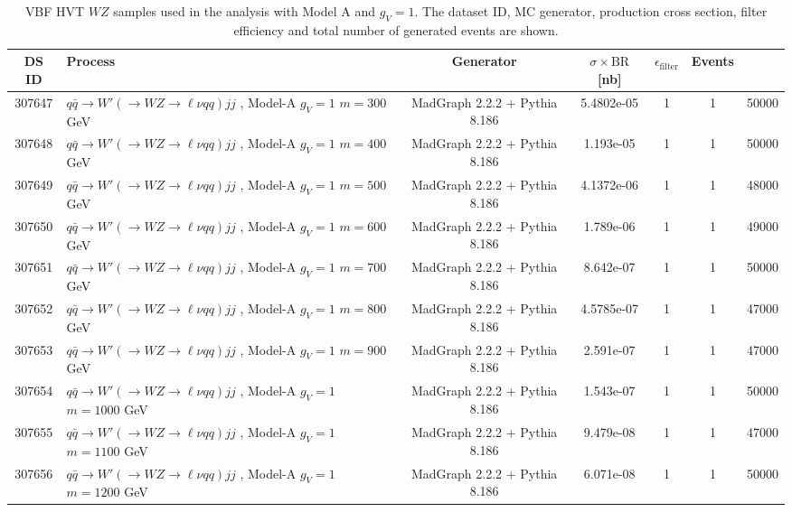 \begin{landscape}
	\begin{table}[!htb]
		\caption{VBF HVT $WZ$ samples used in the analysis with Model A and $g_V=1$. The dataset ID, MC generator, production cross section, filter efficiency and total number of generated events are shown.}
		\label{tabular:mc_samples_WprimeVBF}
		\begin{footnotesize}
			\begin{center}
				\begin{tabular}{|c|l|c|c|c|c|r|}
					\hline
					DS ID & Process & Generator & $\sigma\times\text{BR}$ [nb] & $\epsilon_{\text{filter}}$ & Events \\ \hline
					307647 & $q\bar{q} \to W'\left(\to WZ \to \ell\nu qq\right) jj$ , Model-A $g_V=1$ $m=300$  GeV& MadGraph 2.2.2 + Pythia 8.186 & 5.4802e-05 & 1 & 1 & 50000 \\
					307648 & $q\bar{q} \to W'\left(\to WZ \to \ell\nu qq\right) jj$ , Model-A $g_V=1$ $m=400$  GeV& MadGraph 2.2.2 + Pythia 8.186 & 1.193e-05 & 1 & 1 & 50000 \\
					307649 & $q\bar{q} \to W'\left(\to WZ \to \ell\nu qq\right) jj$ , Model-A $g_V=1$ $m=500$  GeV& MadGraph 2.2.2 + Pythia 8.186 & 4.1372e-06 & 1 & 1 & 48000 \\
					307650 & $q\bar{q} \to W'\left(\to WZ \to \ell\nu qq\right) jj$ , Model-A $g_V=1$ $m=600$  GeV& MadGraph 2.2.2 + Pythia 8.186 & 1.789e-06 & 1 & 1 & 49000 \\
					307651 & $q\bar{q} \to W'\left(\to WZ \to \ell\nu qq\right) jj$ , Model-A $g_V=1$ $m=700$  GeV& MadGraph 2.2.2 + Pythia 8.186 & 8.642e-07 & 1 & 1 & 50000 \\
					307652 & $q\bar{q} \to W'\left(\to WZ \to \ell\nu qq\right) jj$ , Model-A $g_V=1$ $m=800$  GeV& MadGraph 2.2.2 + Pythia 8.186 & 4.5785e-07 & 1 & 1 & 47000 \\
					307653 & $q\bar{q} \to W'\left(\to WZ \to \ell\nu qq\right) jj$ , Model-A $g_V=1$ $m=900$  GeV& MadGraph 2.2.2 + Pythia 8.186 & 2.591e-07 & 1 & 1 & 47000 \\
					307654 & $q\bar{q} \to W'\left(\to WZ \to \ell\nu qq\right) jj$ , Model-A $g_V=1$ $m=1000$ GeV& MadGraph 2.2.2 + Pythia 8.186 & 1.543e-07 & 1 & 1 & 50000 \\
					307655 & $q\bar{q} \to W'\left(\to WZ \to \ell\nu qq\right) jj$ , Model-A $g_V=1$ $m=1100$ GeV& MadGraph 2.2.2 + Pythia 8.186 & 9.479e-08 & 1 & 1 & 47000 \\
					307656 & $q\bar{q} \to W'\left(\to WZ \to \ell\nu qq\right) jj$ , Model-A $g_V=1$ $m=1200$ GeV& MadGraph 2.2.2 + Pythia 8.186 & 6.071e-08 & 1 & 1 & 50000 \\

\end{tabular}
\end{center}
\end{footnotesize}
\end{table}
\end{landscape}
